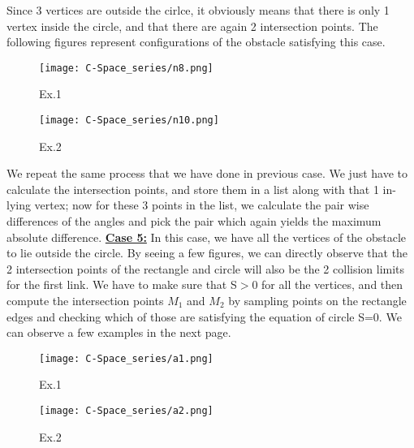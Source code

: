 \documentclass[12pt]{article}
\begin{document}
\newline
\newline
Since 3 vertices are outside the cirlce, it obviously means that there is only 1 vertex inside the circle, and that there are again 2 intersection points. The following figures represent configurations of the obstacle satisfying this case.
\begin{figure}[h!]
    \centering
    \begin{minipage}{0.48\textwidth}
        \centering
        \texttt{[image: C-Space\_series/n8.png]}
        \caption{Ex.1}
        \label{fig:n8}
    \end{minipage}
    \hfill
    \begin{minipage}{0.48\textwidth}
        \centering
        \texttt{[image: C-Space\_series/n10.png]}
        \caption{Ex.2}
        \label{fig:n10}
    \end{minipage}
\end{figure}
We repeat the same process that we have done in previous case.
\newline
We just have to calculate the intersection points, and store them in a list along with that 1 in-lying vertex; now for these 3 points in the list, we calculate the pair wise differences of the angles and pick the pair which again yields the maximum absolute difference.
\newline
\newline
\underline{\textbf{Case 5:}}
\newline
In this case, we have all the vertices of the obstacle to lie outside the circle. By seeing a few figures, we can directly observe that the 2 intersection points of the rectangle and circle will also be the 2 collision limits for the first link. We have to make sure that S$>$0 for all the vertices, and then compute the intersection points $M_1$ and $M_2$ by sampling points on the rectangle edges and checking which of those are satisfying the equation of circle S=0. We can observe a few examples in the next page.
\clearpage
\begin{figure}[h!]
    \centering
    \begin{minipage}{0.48\textwidth}
        \centering
        \texttt{[image: C-Space\_series/a1.png]}
        \caption{Ex.1}
        \label{fig:a1}
    \end{minipage}
    \hfill
    \begin{minipage}{0.48\textwidth}
        \centering
        \texttt{[image: C-Space\_series/a2.png]}
        \caption{Ex.2}
        \label{fig:a2}
    \end{minipage}
\end{figure}
\end{document}
